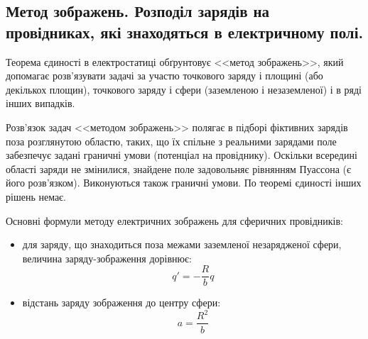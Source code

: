\subsection*{Метод зображень. Розподіл зарядів на провідниках, які знаходяться в електричному полі.}\label{image_method}

\begin{Theory}\small

Теорема єдиності в електростатиці обґрунтовує <<метод зображень>>, який допомагає розв'язувати задачі за участю точкового заряду і площині (або декількох площин), точкового заряду і сфери (заземленою і незаземленої) і в ряді інших випадків.

Розв'язок задач <<методом зображень>> полягає в підборі фіктивних зарядів поза розглянутою областю, таких, що їх спільне з реальними зарядами поле забезпечує задані граничні умови (потенціал на провіднику). Оскільки всередині області заряди не змінилися, знайдене поле задовольняє рівнянням Пуассона (є його розв'язком). Виконуються також граничні умови. По теоремі єдиності інших рішень немає.


Основні формули методу електричних зображень для сферичних провідників:

\begin{itemize}
	\item для заряду, що знаходиться поза межами заземленої незарядженої сфери, величина заряду-зображення дорівнює:
	\begin{equation}\label{mirror_q_outside}
		q' = -\frac{R}{b}q
	\end{equation}

	\item відстань заряду зображення до центру сфери:
	\begin{equation}\label{mirror_q_outside}
	a = \frac{R^2}{b}
	\end{equation}
\end{itemize}


\end{Theory}
